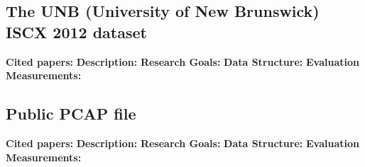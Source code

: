 \subsection{The UNB (University of New Brunswick) ISCX 2012 dataset }
\textbf{Cited papers:} \newline
\textbf{Description:} \newline
\textbf{Research Goals:}  \newline
\textbf{Data Structure:} \newline
\textbf{Evaluation Measurements:} \newline


\subsection{Public PCAP file}
\textbf{Cited papers:} \newline
\textbf{Description:} \newline
\textbf{Research Goals:}  \newline
\textbf{Data Structure:} \newline
\textbf{Evaluation Measurements:} \newline

